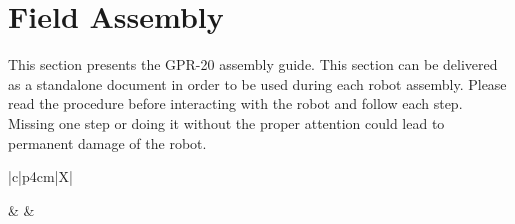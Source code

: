 \documentclass{article}
\begin{document}
\newpage
\section{Field Assembly}
This section presents the GPR-20 assembly guide. This section can be delivered as a standalone document in order to be used during each robot assembly. Please read the procedure before interacting with the robot and follow each step. Missing one step or doing it without the proper attention could lead to permanent damage of the robot.


\begin{onehalfspacing}
\begin{xltabular}{\textwidth}{|c|p{4cm}|X|}
    
    \hline  &  & \\ \hline
    \endfirsthead
    
     \\ \hline
    \endfoot
    
    \endlastfoot
    

\end{xltabular}
\end{onehalfspacing}
\end{document}
